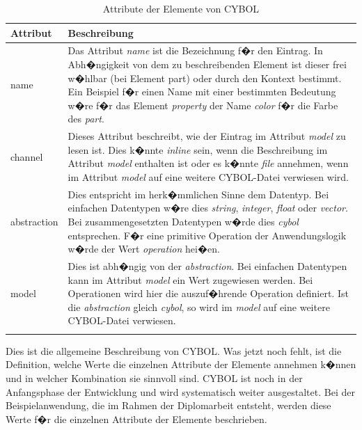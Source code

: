           \begin{longtable}{|l|p{10cm}|}
            \hline
            \textbf{Attribut} & \textbf{Beschreibung}
            \\ \hline
            name & 
            Das Attribut \emph{name} ist die Bezeichnung f�r den Eintrag. In Abh�ngigkeit 
            von dem zu beschreibenden Element ist dieser frei w�hlbar (bei Element part) 
            oder durch den Kontext
            bestimmt. Ein Beispiel f�r einen Name mit einer bestimmten Bedeutung w�re 
            f�r das Element \emph{property} der Name \emph{color} f�r die Farbe des \emph{part}.
            \\ \hline
            channel & 
            Dieses Attribut beschreibt, wie der Eintrag im Attribut \emph{model} zu lesen ist.
            Dies k�nnte \emph{inline} sein,
            wenn die Beschreibung im Attribut \emph{model} enthalten ist oder es 
            k�nnte \emph{file}
            annehmen, wenn im  Attribut \emph{model} auf eine weitere CYBOL-Datei 
            verwiesen wird.
            \\ \hline
            abstraction & 
            Dies entspricht im herk�mmlichen Sinne dem Datentyp. Bei einfachen Datentypen w�re dies 
            \emph{string}, \emph{integer}, \emph{float} oder \emph{vector}. Bei zusammengesetzten 
            Datentypen w�rde dies \emph{cybol} entsprechen. F�r eine primitive
            Operation der Anwendungslogik w�rde der Wert \emph{operation} hei�en.  
            \\ \hline
            model & 
            Dies ist abh�ngig von der \emph{abstraction}. Bei einfachen Datentypen kann im 
            Attribut \emph{model} ein Wert zugewiesen werden.
            Bei Operationen wird hier die auszuf�hrende Operation definiert. Ist die \emph{abstraction}
            gleich \emph{cybol}, so wird im \emph{model} auf eine weitere CYBOL-Datei verwiesen.
            \\ \hline
            \caption{Attribute der Elemente von CYBOL}
            \label{tab:AttributeDerElementeVonCYBOL}
          \end{longtable}
      Dies ist die allgemeine Beschreibung von CYBOL. Was jetzt noch fehlt, ist die Definition,
      welche Werte die einzelnen Attribute der Elemente annehmen k�nnen und in welcher Kombination
      sie sinnvoll sind. CYBOL ist noch in der Anfangsphase der Entwicklung und wird
      systematisch weiter ausgestaltet. Bei  der Beispielanwendung, die im Rahmen der Diplomarbeit entsteht, 
      werden diese Werte f�r die einzelnen Attribute der Elemente beschrieben.
      
